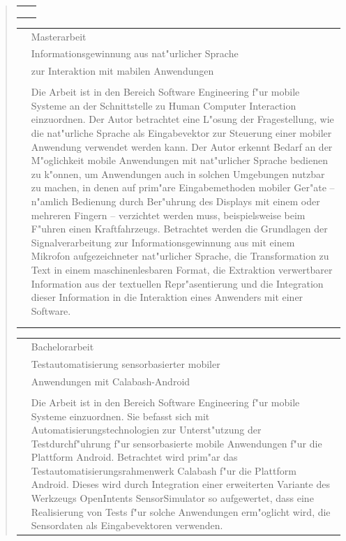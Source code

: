 \begin{quote}
\begin{tabular}{p{4cm}l}
\begin{minipage}{10cm}
		\end{minipage}\\\\\\
	\end{tabular}
%
	\begin{tabular}{p{4cm}l}
		&Masterarbeit\\
		&\qquad Informationsgewinnung aus nat"urlicher Sprache\\
		&\qquad zur Interaktion mit mabilen Anwendungen\\\\
		&\begin{minipage}{10cm}
		Die Arbeit ist in den Bereich Software Engineering f"ur mobile Systeme an der Schnittstelle zu Human Computer Interaction einzuordnen. Der Autor betrachtet eine L"osung der Fragestellung, wie die nat"urliche Sprache als Eingabevektor zur Steuerung einer mobiler Anwendung verwendet werden kann. Der Autor erkennt Bedarf an der M"oglichkeit mobile Anwendungen mit nat"urlicher Sprache bedienen zu k"onnen, um Anwendungen auch in solchen Umgebungen nutzbar zu machen, in denen auf prim"are Eingabemethoden mobiler Ger"ate -- n"amlich Bedienung durch Ber"uhrung des Displays mit einem oder mehreren Fingern -- verzichtet werden muss, beispielsweise beim F"uhren einen Kraftfahrzeugs. Betrachtet werden die Grundlagen der Signalverarbeitung zur Informationsgewinnung aus mit einem Mikrofon aufgezeichneter nat"urlicher Sprache, die Transformation zu Text in einem maschinenlesbaren Format, die Extraktion verwertbarer Information aus der textuellen Repr"asentierung und die Integration dieser Information in die Interaktion eines Anwenders mit einer Software. 
		\end{minipage}\\\\\\
	\end{tabular}
%
	\begin{tabular}{p{4cm}l}
		&Bachelorarbeit\\
		&\qquad Testautomatisierung sensorbasierter mobiler\\
		&\qquad Anwendungen mit Calabash-Android\\\\
		&\begin{minipage}{10cm}
		Die Arbeit ist in den Bereich Software Engineering f"ur mobile Systeme einzuordnen. Sie befasst sich mit Automatisierungstechnologien zur Unterst"utzung der Testdurchf"uhrung f"ur sensorbasierte mobile Anwendungen f"ur die Plattform Android. Betrachtet wird prim"ar das Testautomatisierungsrahmenwerk Calabash f"ur die Plattform Android. Dieses wird durch Integration einer erweiterten Variante des Werkzeugs OpenIntents SensorSimulator so aufgewertet, dass eine Realisierung von Tests f"ur solche Anwendungen erm"oglicht wird, die Sensordaten als Eingabevektoren verwenden.

\end{minipage}
\end{tabular}
\end{quote}
